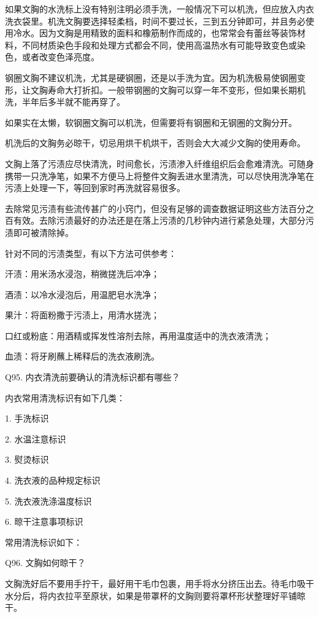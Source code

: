 \documentclass[12pt,UTF8]{ctexbook}
\begin{document}
如果文胸的水洗标上没有特别注明必须手洗，一般情况下可以机洗，但应放入内衣洗衣袋里。机洗文胸要选择轻柔档，时间不要过长，三到五分钟即可，并且务必使用冷水。因为文胸是用精致的面料和橡筋制作而成的，也常常会有蕾丝等装饰材料，不同材质染色手段和处理方式都会不同，使用高温热水有可能导致变色或染色，或者改变色泽亮度。


钢圈文胸不建议机洗，尤其是硬钢圈，还是以手洗为宜。因为机洗极易使钢圈变形，让文胸寿命大打折扣。一般带钢圈的文胸可以穿一年不变形，但如果长期机洗，半年后多半就不能再穿了。

如果实在太懒，软钢圈文胸可以机洗，但需要将有钢圈和无钢圈的文胸分开。

机洗后的文胸务必晾干，切忌用烘干机烘干，否则会大大减少文胸的使用寿命。


文胸上落了污渍应尽快清洗，时间愈长，污渍渗入纤维组织后会愈难清洗。可随身携带一只洗净笔，如果不方便马上将整件文胸丢进水里清洗，可以尽快用洗净笔在污渍上处理一下，等回到家时再洗就容易很多。

去除常见污渍有些流传甚广的小窍门，但没有足够的调查数据证明这些方法百分之百有效。去除污渍最好的办法还是在落上污渍的几秒钟内进行紧急处理，大部分污渍即可被清除掉。


针对不同的污渍类型，有以下方法可供参考：

汗渍：用米汤水浸泡，稍微搓洗后冲净；

酒渍：以冷水浸泡后，用温肥皂水洗净；

果汁：将面粉撒于污渍上，用清水搓洗；

口红或粉底：用酒精或挥发性溶剂去除，再用温度适中的洗衣液清洗；

血渍：将牙刷蘸上稀释后的洗衣液刷洗。





Q95. 内衣清洗前要确认的清洗标识都有哪些？

内衣常用清洗标识有如下几类：

1. 手洗标识

2. 水温注意标识

3. 熨烫标识

4. 洗衣液的品种规定标识

5. 洗衣液洗涤温度标识

6. 晾干注意事项标识



常用清洗标识如下：





Q96. 文胸如何晾干？


文胸洗好后不要用手拧干，最好用干毛巾包裹，用手将水分挤压出去。待毛巾吸干水分后，将内衣拉平至原状，如果是带罩杯的文胸则要将罩杯形状整理好平铺晾干。
\end{document}
